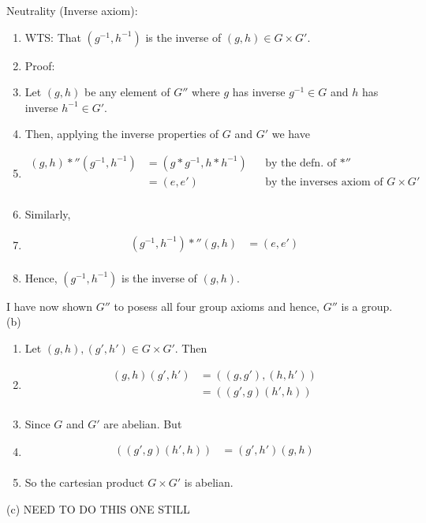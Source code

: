 Neutrality (Inverse axiom):
\begin{enumerate}[nosep]
\item[] WTS: That $(g^{-1},h^{-1})$ is the inverse of $(g,h) \in G \times G'$.
\item[] Proof:
\item[] Let $(g,h)$ be any element of $G''$ where $g$ has inverse $g^{-1} \in G$ and $h$ has inverse $h^{-1} \in G'$.
\item[] Then, applying the inverse properties of $G$ and $G'$ we have
\item[] \begin{align*}
  (g,h) *'' (g^{-1},h^{-1}) &= (g * g^{-1}, h * h^{-1}) & &\text{by the defn. of $*''$} \\
  &= (e, e') & &\text{by the inverses axiom of $G \times G'$} \\
\end{align*}
\item[] Similarly,
\item[] \begin{align*}
  (g^{-1},h^{-1}) *'' (g,h) &= (e, e') \\
\end{align*}
\item[] Hence, $(g^{-1}, h^{-1})$ is the inverse of $(g,h)$.
\end{enumerate}

I have now shown $G''$ to posess all four group axioms and hence, $G''$ is a group. \\

(b)
\begin{enumerate}[nosep]
\item[] Let $(g,h), (g',h') \in G \times G'$. Then
\item[] \begin{align*}
  (g,h)(g',h') &= ((g,g'),(h,h')) \\
  &= ((g',g)(h',h)) \\
\end{align*}
\item[] Since $G$ and $G'$ are abelian. But
\item[] \begin{align*}
  ((g',g)(h',h)) &= (g',h')(g,h) \\
\end{align*}
\item[] So the cartesian product $G \times G'$ is abelian.
\end{enumerate}

(c)
NEED TO DO THIS ONE STILL

